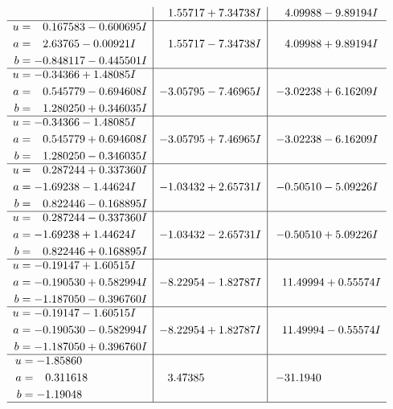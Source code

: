 \documentclass[1p]{elsarticle_modified}
\theoremstyle{definition}
\begin{document}
$$\begin{array}{c|c|c}
 & \phantom{-}1.55717 + 7.34738 I & \phantom{-}4.09988 - 9.89194 I \\ \hline\begin{aligned}
u &= \phantom{-}0.167583 - 0.600695 I \\
a &= \phantom{-}2.63765 - 0.00921 I \\
b &= -0.848117 - 0.445501 I\end{aligned}
 & \phantom{-}1.55717 - 7.34738 I & \phantom{-}4.09988 + 9.89194 I \\ \hline\begin{aligned}
u &= -0.34366 + 1.48085 I \\
a &= \phantom{-}0.545779 - 0.694608 I \\
b &= \phantom{-}1.280250 + 0.346035 I\end{aligned}
 & -3.05795 - 7.46965 I & -3.02238 + 6.16209 I \\ \hline\begin{aligned}
u &= -0.34366 - 1.48085 I \\
a &= \phantom{-}0.545779 + 0.694608 I \\
b &= \phantom{-}1.280250 - 0.346035 I\end{aligned}
 & -3.05795 + 7.46965 I & -3.02238 - 6.16209 I \\ \hline\begin{aligned}
u &= \phantom{-}0.287244 + 0.337360 I \\
a &= -1.69238 - 1.44624 I \\
b &= \phantom{-}0.822446 - 0.168895 I\end{aligned}
 & -1.03432 + 2.65731 I & -0.50510 - 5.09226 I \\ \hline\begin{aligned}
u &= \phantom{-}0.287244 - 0.337360 I \\
a &= -1.69238 + 1.44624 I \\
b &= \phantom{-}0.822446 + 0.168895 I\end{aligned}
 & -1.03432 - 2.65731 I & -0.50510 + 5.09226 I \\ \hline\begin{aligned}
u &= -0.19147 + 1.60515 I \\
a &= -0.190530 + 0.582994 I \\
b &= -1.187050 - 0.396760 I\end{aligned}
 & -8.22954 - 1.82787 I & \phantom{-}11.49994 + 0.55574 I \\ \hline\begin{aligned}
u &= -0.19147 - 1.60515 I \\
a &= -0.190530 - 0.582994 I \\
b &= -1.187050 + 0.396760 I\end{aligned}
 & -8.22954 + 1.82787 I & \phantom{-}11.49994 - 0.55574 I \\ \hline\begin{aligned}
u &= -1.85860\phantom{ +0.000000I} \\
a &= \phantom{-}0.311618\phantom{ +0.000000I} \\
b &= -1.19048\phantom{ +0.000000I}\end{aligned}
 & \phantom{-}3.47385\phantom{ +0.000000I} & -31.1940\phantom{ +0.000000I}\\
 \hline 
 \end{array}$$\newpage
\end{document}
